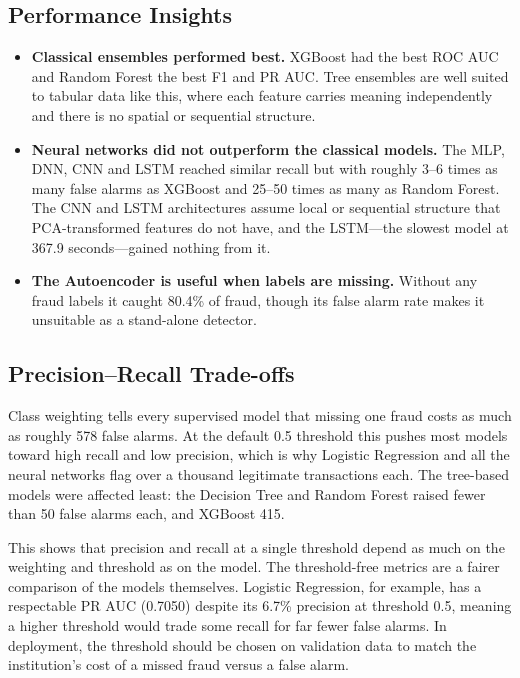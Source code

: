 \documentclass[journal]{IEEEtran}
\begin{document}
\subsection{Performance Insights}
\begin{itemize}
  \item \textbf{Classical ensembles performed best.} XGBoost had the best ROC AUC and Random Forest the best F1 and PR AUC. Tree ensembles are well suited to tabular data like this, where each feature carries meaning independently and there is no spatial or sequential structure.
  \item \textbf{Neural networks did not outperform the classical models.} The MLP, DNN, CNN and LSTM reached similar recall but with roughly 3--6 times as many false alarms as XGBoost and 25--50 times as many as Random Forest. The CNN and LSTM architectures assume local or sequential structure that PCA-transformed features do not have, and the LSTM---the slowest model at 367.9 seconds---gained nothing from it.
  \item \textbf{The Autoencoder is useful when labels are missing.} Without any fraud labels it caught 80.4\% of fraud, though its false alarm rate makes it unsuitable as a stand-alone detector.
\end{itemize}

\subsection{Precision--Recall Trade-offs}
Class weighting tells every supervised model that missing one fraud costs as much as roughly 578 false alarms. At the default 0.5 threshold this pushes most models toward high recall and low precision, which is why Logistic Regression and all the neural networks flag over a thousand legitimate transactions each. The tree-based models were affected least: the Decision Tree and Random Forest raised fewer than 50 false alarms each, and XGBoost 415.

This shows that precision and recall at a single threshold depend as much on the weighting and threshold as on the model. The threshold-free metrics are a fairer comparison of the models themselves. Logistic Regression, for example, has a respectable PR AUC (0.7050) despite its 6.7\% precision at threshold 0.5, meaning a higher threshold would trade some recall for far fewer false alarms. In deployment, the threshold should be chosen on validation data to match the institution's cost of a missed fraud versus a false alarm.
\end{document}
